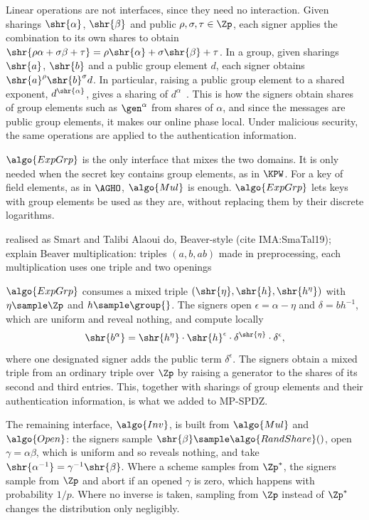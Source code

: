 Linear operations are not interfaces, since they need no interaction. Given
sharings $\shr{\alpha}$, $\shr{\beta}$ and public $\rho, \sigma, \tau \in \Zp$,
each signer applies the combination to its own shares to obtain $\shr{\rho\alpha
+ \sigma\beta + \tau} = \rho\shr{\alpha} + \sigma\shr{\beta} + \tau$. In a group,
given sharings $\shr{a}$, $\shr{b}$ and a public group element $d$, each signer
obtains $\shr{a}^{\rho}\shr{b}^{\sigma}d$. In particular, raising a public group
element to a shared exponent, $d^{\shr{\alpha}}$, gives a sharing of
$d^{\alpha}$~\cite{FOCS:Feldman87,LC:ADEO21}. This is how the signers obtain
shares of group elements such as $\gen^{\alpha}$ from shares of $\alpha$, and
since the messages are public group elements, it makes our online phase local. Under malicious security, the same operations are applied to the
authentication information.

$\algo{ExpGrp}$ is the only interface that mixes the two domains. It is only
needed when the secret key contains group elements, as in $\KPW$. For a key of
field elements, as in $\AGHO$, $\algo{Mul}$ is enough. $\algo{ExpGrp}$ lets keys
with group elements be used as they are, without replacing them by their
discrete logarithms.

\begin{outline}
  \item realised as Smart and Talibi Alaoui do, Beaver-style (cite IMA:SmaTal19);
explain Beaver multiplication: triples $(a, b, ab)$ made in preprocessing, each
multiplication uses one triple and two openings
\end{outline}

$\algo{ExpGrp}$ consumes a mixed triple $(\shr{\eta}, \shr{h}, \shr{h^\eta})$
with $\eta \sample \Zp$ and $h \sample \group{}$. The signers open $\epsilon =
\alpha - \eta$ and $\delta = b h^{-1}$, which are uniform and reveal nothing, and
compute locally
%
\begin{equation*}
%
  \shr{b^{\alpha}} = \shr{h^{\eta}} \cdot \shr{h}^{\epsilon} \cdot
\delta^{\shr{\eta}} \cdot \delta^{\epsilon},
%
\end{equation*}
%
where one designated signer adds the public term $\delta^{\epsilon}$. The
signers obtain a mixed triple from an ordinary triple over $\Zp$ by raising a
generator to the shares of its second and third entries. This, together with
sharings of group elements and their authentication information, is what we
added to MP-SPDZ.

The remaining interface, $\algo{Inv}$, is built from $\algo{Mul}$ and
$\algo{Open}$: the signers sample $\shr{\beta} \sample \algo{RandShare}()$, open
$\gamma = \alpha\beta$, which is uniform and so reveals nothing, and take
$\shr{\alpha^{-1}} = \gamma^{-1}\shr{\beta}$. Where a scheme samples from
$\Zp^*$, the signers sample from $\Zp$ and abort if an opened $\gamma$ is zero,
which happens with probability $1/p$. Where no inverse is taken, sampling from
$\Zp$ instead of $\Zp^*$ changes the distribution only negligibly.

